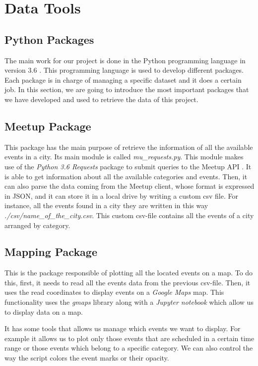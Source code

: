 \section{Data Tools}\label{sec:toolsanddata}
\subsection{Python Packages} 
The main work for our project is done in the Python programming language in version 3.6 \cite{python}. This programming language is used to develop different packages. Each package is in charge of managing a specific dataset and it does a certain job. In this section, we are going to introduce the most important packages that we have developed and used to retrieve the data of this project.

\subsection{Meetup Package}
This package has the main purpose of retrieve the information of all the available events in a city. Its main module is called \textit{mu\_requests.py}. This module makes use of the \textit{Python 3.6 Requests} package \cite{requests} to submit queries to the Meetup API \cite{meetupapi}. It is able to get information about all the available categories and events. Then, it can also parse the data coming from the Meetup client, whose format is expressed in JSON, and it can store it in a local drive by writing a custom csv file. For instance, all the events found in a city they are written in this way \textit{./csv/name\_of\_the\_city.csv}. This custom csv-file contains all the events of a city arranged by category.

\subsection{Mapping Package}
This is the package responsible of plotting all the located events on a map. To do this, first, it needs to read all the events data from the previous csv-file. Then, it uses the read coordinates to display events on a \emph{Google Maps} map. This functionality uses the \textit{gmaps} library \cite{gmaps} along with a \textit{Jupyter notebook} \cite{jupyter} which allow us to display data on a map.

It has some tools that allows us manage which events we want to display. For example it allows us to plot only those events that are scheduled in a certain time range or those events which belong to a specific category. We can also control the way the script colors the event marks or their opacity.

